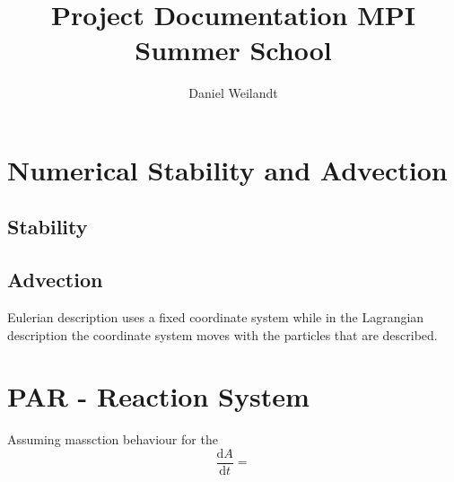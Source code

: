 \documentclass[a4paper]{article}
\title{Project Documentation MPI Summer School}
\author{Daniel Weilandt}
\begin{document}
\maketitle
\section{Numerical Stability and Advection}
\subsection{Stability}

\subsection{Advection}
Eulerian description uses a fixed coordinate system while in the Lagrangian description the coordinate system moves with the particles that are described. 



\section{PAR - Reaction System }
Assuming massction behaviour for the 
\begin{equation}
\frac{\mathrm{d}A}{\mathrm{d}t} = 
\end{equation}
\end{document}
